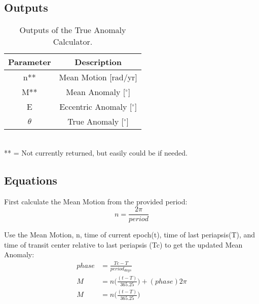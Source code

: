 \documentclass[10pt,preprint]{aastex}
\begin{document}
\subsection{Outputs}

\begin{table}[h]
\centering
\caption{ Outputs of the True Anomaly Calculator.}
\begin{tabular}{c c}
\hline\hline
Parameter & Description \\
\hline
n** & Mean Motion [rad/yr] \\
M** & Mean Anomaly [$^{\circ}$]\\
E & Eccentric Anomaly [$^{\circ}$]\\
$\theta$ & True Anomaly [$^{\circ}$]\\
\hline
\end{tabular}
\\
 ** = Not currently returned, but easily could be if needed.
\end{table}

\subsection{Equations}

First calculate the Mean Motion from the provided period:
\begin{equation}\label{eq:4.1.1}
n = \frac{2\pi}{period} 
\end{equation}

Use the Mean Motion, n, time of current epoch(t), time of last periapsis(T), and time of transit center relative to last periapsis (Tc) to get the updated Mean Anomaly:
\begin{subequations}\label{eq:RV-Ma}
\begin{align}
phase& = \frac{Tc-T}{period_{days}} \\
\label{eq:RV-Mb}
M& = n \bigg( \frac{(t-T)}{365.25} \bigg)+(phase)2\pi\\
\label{eq:4.1.2}
M& = n \bigg( \frac{(t-T)}{365.25} \bigg)
\end{align}
\end{subequations}
\end{document}
